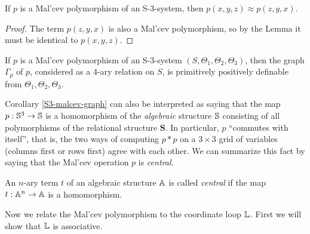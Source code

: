 \documentclass[letterpaper,11pt]{article}
\begin{document}
\begin{cor} If $p$ is a Mal'cev polymorphism of an S-3-system, then $p(x,y,z) \approx p(z,y,x)$.
\end{cor}
\begin{proof} The term $p(z,y,x)$ is also a Mal'cev polymorphism, so by the Lemma it must be identical to $p(x,y,z)$.
\end{proof}

\begin{cor}\label{S3-malcev-graph} If $p$ is a Mal'cev polymorphism of an S-3-system $(S,\Theta_1,\Theta_2,\Theta_3)$, then the graph $\Gamma_p$ of $p$, considered as a $4$-ary relation on $S$, is primitively positively definable from $\Theta_1,\Theta_2,\Theta_3$.
\end{cor}

Corollary \ref{S3-malcev-graph} can also be interpreted as saying that the map $p : \mathbb{S}^3 \rightarrow \mathbb{S}$ is a homomorphism of the \emph{algebraic} structure $\mathbb{S}$ consisting of all polymorphisms of the relational structure $\mathbf{S}$. In particular, $p$ ``commutes with itself'', that is, the two ways of computing $p*p$ on a $3\times 3$ grid of variables (columns first or rows first) agree with each other. We can summarize this fact by saying that the Mal'cev operation $p$ is \emph{central}.

\begin{defn} An $n$-ary term $t$ of an algebraic structure $\mathbb{A}$ is called \emph{central} if the map $t : \mathbb{A}^n \rightarrow \mathbb{A}$ is a homomorphism.
\end{defn}

Now we relate the Mal'cev polymorphism to the coordinate loop $\mathbb{L}$. First we will show that $\mathbb{L}$ is associative.
\end{document}
